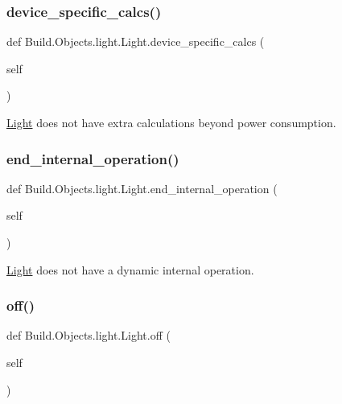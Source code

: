 \subsubsection{\texorpdfstring{device\+\_\+specific\+\_\+calcs()}{device\_specific\_calcs()}}
{\footnotesize\ttfamily def Build.\+Objects.\+light.\+Light.\+device\+\_\+specific\+\_\+calcs (\begin{DoxyParamCaption}\item[{}]{self }\end{DoxyParamCaption})}



\hyperlink{class_build_1_1_objects_1_1light_1_1_light}{Light} does not have extra calculations beyond power consumption. 

\mbox{\label{class_build_1_1_objects_1_1light_1_1_light_a42cd8cee6c1f83d8ef053f095f852056}} 
\subsubsection{\texorpdfstring{end\+\_\+internal\+\_\+operation()}{end\_internal\_operation()}}
{\footnotesize\ttfamily def Build.\+Objects.\+light.\+Light.\+end\+\_\+internal\+\_\+operation (\begin{DoxyParamCaption}\item[{}]{self }\end{DoxyParamCaption})}



\hyperlink{class_build_1_1_objects_1_1light_1_1_light}{Light} does not have a dynamic internal operation. 

\mbox{\label{class_build_1_1_objects_1_1light_1_1_light_a1a7479e6107f3aa664936a234d66c689}} 
\subsubsection{\texorpdfstring{off()}{off()}}
{\footnotesize\ttfamily def Build.\+Objects.\+light.\+Light.\+off (\begin{DoxyParamCaption}\item[{}]{self }\end{DoxyParamCaption})}



